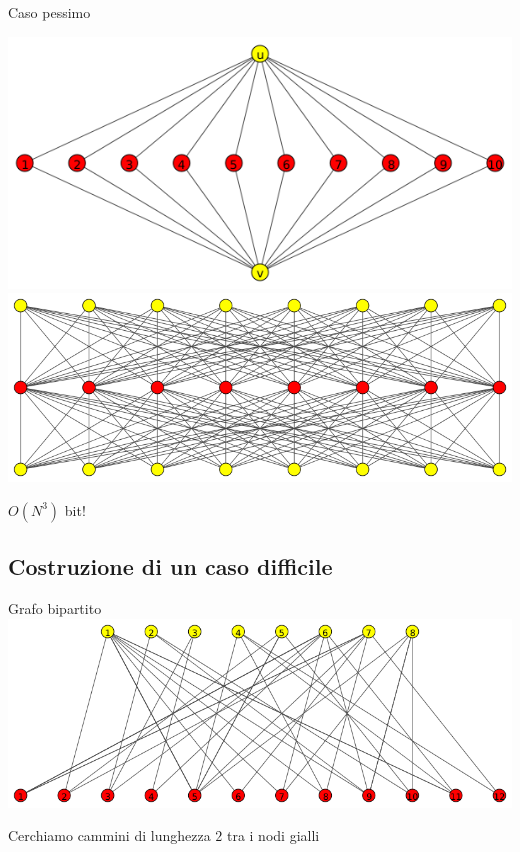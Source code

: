 \documentclass{beamer}
\theoremstyle{plain}
\theoremstyle{definition}
\theoremstyle{remark}
\newcommand{\pa}[1]{\left(#1\right)}
\begin{document}
\begin{frame}{Caso pessimo}
      \begin{overprint}
         \includegraphics[width=\textwidth]{diamante}
         \includegraphics[width=\textwidth]{diamantemultiplo}
        \begin{center}
          $O\pa{N^3}$ bit!
        \end{center}
      \end{overprint}

\end{frame}

\subsection{Costruzione di un caso difficile}

\begin{frame}{Grafo bipartito}
  \includegraphics[width=\textwidth]{bipartito}
  
  Cerchiamo cammini di lunghezza $2$ tra i nodi gialli
\end{frame}
\end{document}
